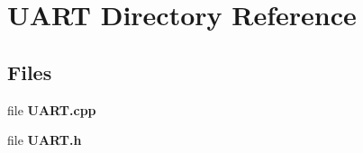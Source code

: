 \section{U\+A\+R\+T Directory Reference}
\label{dir_ebc9cec7537ff1d4a79631ef79929747}
\subsection*{Files}
\begin{DoxyCompactItemize}
\item 
file {\bfseries U\+A\+R\+T.\+cpp}
\item 
file {\bfseries U\+A\+R\+T.\+h}
\end{DoxyCompactItemize}
